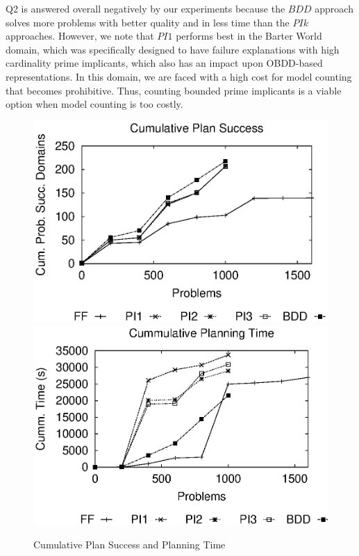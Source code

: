 \documentclass{article}
\begin{document}
Q2 is answered overall negatively by our experiments because the $BDD$ approach solves more problems with better quality and in less time than the $PIk$ approaches.  However, we note that $PI1$ performs best in the Barter World domain, which was specifically designed to have failure explanations with high cardinality prime implicants, which also has an impact upon OBDD-based representations.  In this domain, we are faced with a high cost for model counting that becomes prohibitive.  Thus, counting bounded prime implicants is a viable option when model counting is too costly.

\begin{figure}[t]\vspace*{-.5cm}
\centering\includegraphics[width=.9\linewidth]{./alldom-deadline.eps}\\
\includegraphics[width=.9\linewidth]{./alldom-deadline-time.eps}
\caption{\label{fig:plan} Cumulative Plan Success and Planning Time}
\end{figure}		
\end{document}
